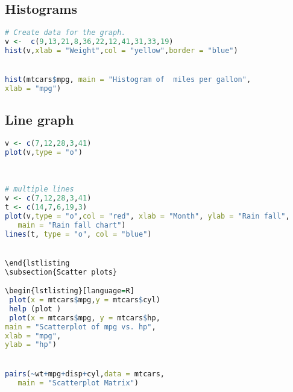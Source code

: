 \documentclass["../Applied_probabillity _and_statistics_lab_KTU.tex"]{subfiles}
\begin{document}
\subsection{Histograms}
\begin{lstlisting}[language=R]
 # Create data for the graph.
v <-  c(9,13,21,8,36,22,12,41,31,33,19)
hist(v,xlab = "Weight",col = "yellow",border = "blue")


hist(mtcars$mpg, main = "Histogram of  miles per gallon",
xlab = "mpg")

\end{lstlisting}
\subsection{Line graph}
\begin{lstlisting}[language=R]
 v <- c(7,12,28,3,41)
plot(v,type = "o") 
 
 

# multiple lines
v <- c(7,12,28,3,41)
t <- c(14,7,6,19,3)
plot(v,type = "o",col = "red", xlab = "Month", ylab = "Rain fall", 
   main = "Rain fall chart")
lines(t, type = "o", col = "blue")


\end{lstlisting
\subsection{Scatter plots}

\begin{lstlisting}[language=R]
 plot(x = mtcars$mpg,y = mtcars$cyl)
 help (plot )
 plot(x = mtcars$mpg, y = mtcars$hp,
main = "Scatterplot of mpg vs. hp",
xlab = "mpg",
ylab = "hp")


pairs(~wt+mpg+disp+cyl,data = mtcars,
   main = "Scatterplot Matrix")


\end{lstlisting}
\end{document}
